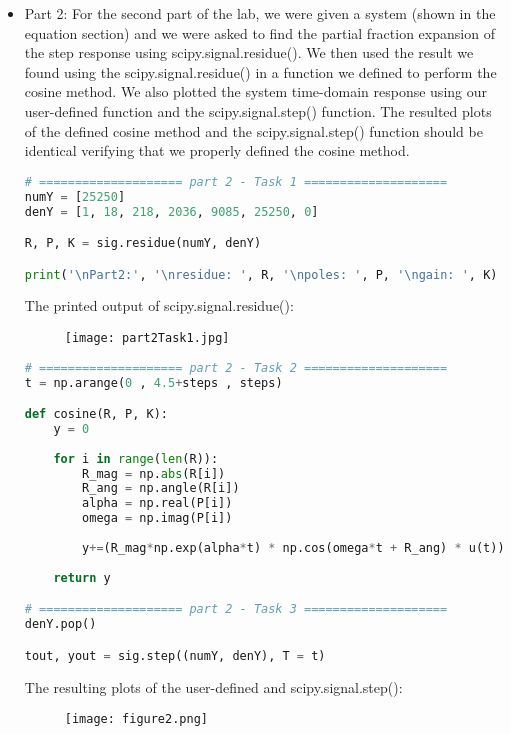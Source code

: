 \documentclass[12pt,a4paper]{article}
\begin{document}
\begin{itemize}
    As can be seen, the printed partial fraction expansion using scipy.signal.residue() agrees with our result from the pre-lab (shown in the equation section).
\clearpage

    \item Part 2:
    For the second part of the lab, we were given a system (shown in the equation section) and we were asked to find the partial fraction expansion of the step response using scipy.signal.residue(). We then used the result we found using the scipy.signal.residue() in a function we defined to perform the cosine method. We also plotted the system time-domain response using our user-defined function and the scipy.signal.step() function. The resulted plots of the defined cosine method and the scipy.signal.step() function should be identical verifying that we properly defined the cosine method. 
    
\begin{lstlisting}[language=Python, caption={partial fraction expansion using scipy.signal.residue()}, label={lst:code}, mathescape=true, breaklines=true]
# ==================== part 2 - Task 1 ====================
numY = [25250]
denY = [1, 18, 218, 2036, 9085, 25250, 0]

R, P, K = sig.residue(numY, denY)

print('\nPart2:', '\nresidue: ', R, '\npoles: ', P, '\ngain: ', K)
\end{lstlisting}

    The printed output of scipy.signal.residue(): 
\begin{figure}[h]
    \centering
    \texttt{[image: part2Task1.jpg]}
\end{figure}\textbf{}

\begin{lstlisting}[language=Python, caption={user-defined and scipy.signal.step() step response}, label={lst:code}, mathescape=true, breaklines=true]
# ==================== part 2 - Task 2 ====================
t = np.arange(0 , 4.5+steps , steps)

def cosine(R, P, K):
    y = 0
    
    for i in range(len(R)):
        R_mag = np.abs(R[i])
        R_ang = np.angle(R[i])
        alpha = np.real(P[i])
        omega = np.imag(P[i])
        
        y+=(R_mag*np.exp(alpha*t) * np.cos(omega*t + R_ang) * u(t))
        
    return y

# ==================== part 2 - Task 3 ====================
denY.pop()

tout, yout = sig.step((numY, denY), T = t)
\end{lstlisting}
\clearpage

    The resulting plots of the user-defined and scipy.signal.step():
\begin{figure}[h]
    \centering
    \texttt{[image: figure2.png]}
\end{figure}\textbf{}
\end{itemize}
\end{document}
